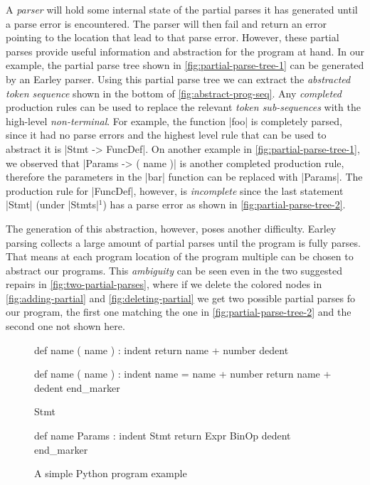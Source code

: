  A \emph{parser} will hold some
internal state of the partial parses it has generated until a parse error is
encountered. The parser will then fail and return an error pointing to the
location that lead to that parse error. However, these partial parses provide
useful information and abstraction for the program at hand. In our example, the
partial parse tree shown in \autoref{fig:partial-parse-tree-1} can be generated
by an Earley parser. Using this partial parse tree we can extract the
\emph{abstracted token sequence} shown in the bottom of
\autoref{fig:abstract-prog-seq}. Any \emph{completed} production rules can be
used to replace the relevant \emph{token sub-sequences} with the high-level
\emph{non-terminal}. For example, the function |foo| is completely parsed, since
it had no parse errors and the highest level rule that can be used to abstract
it is |Stmt -> FuncDef|. On another example in
\autoref{fig:partial-parse-tree-1}, we observed that |Params -> ( name )| is
another completed production rule, therefore the parameters in the |bar|
function can be replaced with |Params|. The production rule for |FuncDef|,
however, is \emph{incomplete} since the last statement |Stmt| (under
|Stmts|$^1$) has a parse error as shown in \autoref{fig:partial-parse-tree-2}.

The generation of this abstraction, however, poses another difficulty. Earley
parsing collects a large amount of partial parses until the program is fully
parses. That means at each program location of the program multiple can be
chosen to abstract our programs. This \emph{ambiguity} can be seen even in the
two suggested repairs in \autoref{fig:two-partial-parses}, where if we delete
the colored nodes in \autoref{fig:adding-partial} and
\autoref{fig:deleting-partial} we get two possible partial parses fo our
program, the first one matching the one in \autoref{fig:partial-parse-tree-2}
and the second one not shown here.


\begin{figure}[t]
\centering
\begin{minipage}[c]{0.54\linewidth}
\begin{ecode}
def name ( name ) : \n
indent return name + number \n
dedent \n

def name ( name ) : \n
indent name = name + number \n
return name + \n
dedent end_marker
\end{ecode}
\label{fig:prog-seq}
\end{minipage}%
\hspace{0.02\linewidth}%
\begin{minipage}[c]{0.44\linewidth}
\begin{ecode}
Stmt \n

def name Params : \n
indent Stmt \n
return Expr BinOp \n
dedent end_marker
\end{ecode}
\label{fig:abstract-prog-seq}
\end{minipage}
\caption{A simple Python program example}
\end{figure}

